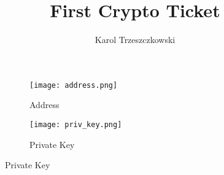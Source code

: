 \documentclass[a4,11pt]{article}
\author{Karol Trzeszczkowski}
\title{First Crypto Ticket}
\begin{document}
\maketitle
\begin{figure}[h!]
\centering
\begin{subfigure}[h]{0.4\textwidth}
\texttt{[image: address.png]}
\caption{Address}
\end{subfigure}
\begin{subfigure}[h]{0.4\textwidth}
\texttt{[image: priv\_key.png]}
\caption{Private Key}
\end{subfigure}
\end{figure}
\end{document}
